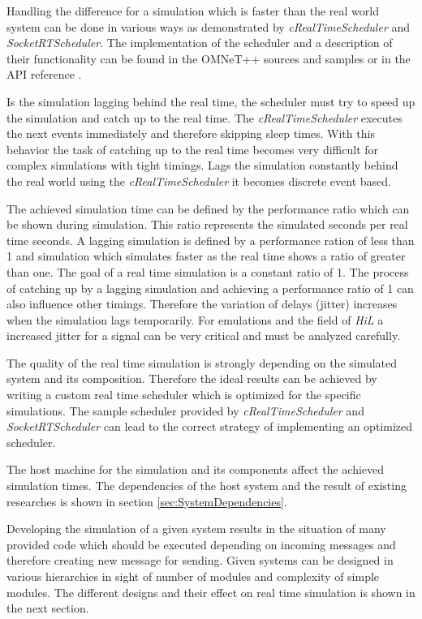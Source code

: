 Handling the difference for a simulation which is faster than the real world system can be done in various ways as demonstrated by \emph{cRealTimeScheduler} and \emph{SocketRTScheduler}.
The implementation of the scheduler and a description of their functionality can be found in the OMNeT++ sources and samples or in the API reference \cite{OMNETAPIREF}.

Is the simulation lagging behind the real time, the scheduler must try to speed up the simulation and catch up to the real time.
The \emph{cRealTimeScheduler} executes the next events immediately and therefore skipping sleep times.
With this behavior the task of catching up to the real time becomes very difficult for complex simulations with tight timings.
Lags the simulation constantly behind the real world using the \emph{cRealTimeScheduler} it becomes discrete event based.

The achieved simulation time can be defined by the performance ratio which can be shown during simulation.
This ratio represents the simulated seconds per real time seconds.
A lagging simulation is defined by a performance ration of less than 1 and simulation which simulates faster as the real time shows a ratio of greater than one.
The goal of a real time simulation is a constant ratio of 1.
The process of catching up by a lagging simulation and achieving a performance ratio of 1 can also influence other timings.
Therefore the variation of delays (jitter) increases when the simulation lags temporarily.
For emulations and the field of \emph{HiL} a increased jitter for a signal can be very critical and must be analyzed carefully.

The quality of the real time simulation is strongly depending on the simulated system and its composition.
Therefore the ideal results can be achieved by writing a custom real time scheduler which is optimized for the specific simulations.
The sample scheduler provided by \emph{cRealTimeScheduler} and \emph{SocketRTScheduler} can lead to the correct strategy of implementing an optimized scheduler.

The host machine for the simulation and its components affect the achieved simulation times.
The dependencies of the host system and the result of existing researches is shown in section \ref{sec:SystemDependencies}.

Developing the simulation of a given system results in the situation of many provided code which should be executed depending on incoming messages and therefore creating new message for sending.
Given systems can be designed in various hierarchies in sight of number of modules and complexity of simple modules.
The different designs and their effect on real time simulation is shown in the next section.

